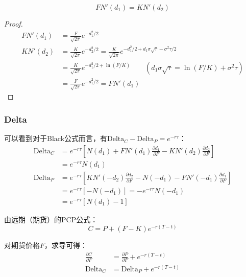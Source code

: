 \documentclass[11pt]{article}
\begin{document}
\begin{lemma}
    \begin{equation*}
        F N'(d_1) = K N'(d_2)
    \end{equation*}
\end{lemma}

\begin{proof}
    \begin{align*}
        FN'(d_1) &= \frac{F}{\sqrt{2\pi}}e^{-d_1^2/2} \\
        KN'(d_2) &= \frac{K}{\sqrt{2\pi}}e^{-d_2^2/2} = \frac{K}{\sqrt{2\pi}}e^{-d_1^2/2+d_1\sigma\sqrt{\tau}-\sigma^2\tau/2} \\
        &= \frac{K}{\sqrt{2\pi}}e^{-d_1^2/2+\ln(F/K)} 
        \qquad \left(d_1\sigma\sqrt{\tau} = \ln(F/K)+\sigma^2\tau\right) \\
        &= \frac{F}{\sqrt{2\pi}}e^{-d_1^2/2} = FN'(d_1)
    \end{align*}
\end{proof}

\subsubsection{Delta}

可以看到对于Black公式而言，有$\text{Delta}_C - \text{Delta}_P = e^{-r\tau}$：
\begin{align*}
    \text{Delta}_C &= e^{-r\tau}\left[N(d_1) + FN'(d_1)\frac{\partial d_1}{\partial F} - KN'(d_2)\frac{\partial d_2}{\partial F}\right] \\
    &= e^{-r\tau}N(d_1) \\
    \text{Delta}_P &= e^{-r\tau}\left[KN'(-d_2)\frac{\partial d_2}{\partial F} - N(-d_1) - FN'(-d_1)\frac{\partial d_1}{\partial F}\right] \\
    &= e^{-r\tau}\left[ -N(-d_1) \right]
    = - e^{-r\tau} N(-d_1) \\
    &= e^{-r\tau}\left[ N(d_1) -1 \right]
\end{align*}

由远期（期货）的PCP公式：
\begin{equation*}
    C = P + \left( F - K \right) e^{-r(T-t)}
\end{equation*}

对期货价格$F$，求导可得：
\begin{align*}
    \frac{\partial C}{\partial F} &= \frac{\partial P}{\partial F} + e^{-r(T-t)} \\
    \text{Delta}_{C} &= \text{Delta}_{P} + e^{-r(T-t)}
\end{align*}
\end{document}
